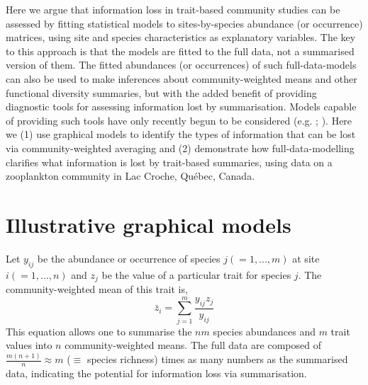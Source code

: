 \documentclass[12pt]{ecology}
\begin{document}
Here we argue that information loss in trait-based community studies can be assessed by fitting statistical models to sites-by-species abundance (or occurrence) matrices, using site and species characteristics as explanatory variables.  The key to this approach is that the models are fitted to the full data, not a summarised version of them.  The fitted abundances (or occurrences) of such full-data-models can also be used to make inferences about community-weighted means and other functional diversity summaries, but with the added benefit of providing diagnostic tools for assessing information lost by summarisation.  Models capable of providing such tools have only recently begun to be considered (e.g. ; ).  Here we (1) use graphical models to identify the types of information that can be lost via community-weighted averaging and (2) demonstrate how full-data-modelling clarifies what information is lost by trait-based summaries, using data on a zooplankton community in Lac Croche, Qu\'{e}bec, Canada.


\section{Illustrative graphical models}
\label{sec:graphmod}

Let $y_{ij}$ be the abundance or occurrence of species $j (= 1, ..., m)$ at site $i (= 1, ..., n)$ and $z_j$ be the value of a particular trait for species $j$.  The community-weighted mean of this trait is, \newpage
\begin{equation} 
\bar{z}_i = \sum_{j=1}^m \frac{y_{ij} z_j}{y_{ij}}
\label{eq:cwmdef}
\end{equation}
This equation allows one to summarise the $nm$ species abundances and $m$ trait values into $n$ community-weighted means.  The full data are composed of $\frac{m(n + 1)}{n} \approx m$ ($\equiv$ species richness) times as many numbers as the summarised data, indicating the potential for information loss via summarisation.

\end{document}
